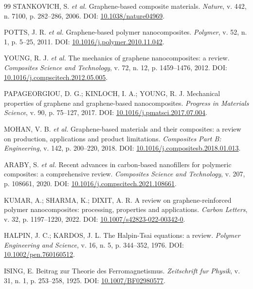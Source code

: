 \documentclass[11pt,a4paper,oneside]{article}
\begin{document}
\begin{thebibliography}{99}
 STANKOVICH, S. \textit{et al.} Graphene-based composite materials. \textit{Nature}, v. 442, n. 7100, p. 282--286, 2006. DOI: \href{https://doi.org/10.1038/nature04969}{10.1038/nature04969}.

 POTTS, J. R. \textit{et al.} Graphene-based polymer nanocomposites. \textit{Polymer}, v. 52, n. 1, p. 5--25, 2011. DOI: \href{https://doi.org/10.1016/j.polymer.2010.11.042}{10.1016/j.polymer.2010.11.042}.

 YOUNG, R. J. \textit{et al.} The mechanics of graphene nanocomposites: a review. \textit{Composites Science and Technology}, v. 72, n. 12, p. 1459--1476, 2012. DOI: \href{https://doi.org/10.1016/j.compscitech.2012.05.005}{10.1016/j.compscitech.2012.05.005}.

 PAPAGEORGIOU, D. G.; KINLOCH, I. A.; YOUNG, R. J. Mechanical properties of graphene and graphene-based nanocomposites. \textit{Progress in Materials Science}, v. 90, p. 75--127, 2017. DOI: \href{https://doi.org/10.1016/j.pmatsci.2017.07.004}{10.1016/j.pmatsci.2017.07.004}.

 MOHAN, V. B. \textit{et al.} Graphene-based materials and their composites: a review on production, applications and product limitations. \textit{Composites Part B: Engineering}, v. 142, p. 200--220, 2018. DOI: \href{https://doi.org/10.1016/j.compositesb.2018.01.013}{10.1016/j.compositesb.2018.01.013}.

 ARABY, S. \textit{et al.} Recent advances in carbon-based nanofillers for polymeric composites: a comprehensive review. \textit{Composites Science and Technology}, v. 207, p. 108661, 2020. DOI: \href{https://doi.org/10.1016/j.compscitech.2021.108661}{10.1016/j.compscitech.2021.108661}.

 KUMAR, A.; SHARMA, K.; DIXIT, A. R. A review on graphene-reinforced polymer nanocomposites: processing, properties and applications. \textit{Carbon Letters}, v. 32, p. 1197--1220, 2022. DOI: \href{https://doi.org/10.1007/s42823-022-00342-0}{10.1007/s42823-022-00342-0}.

 HALPIN, J. C.; KARDOS, J. L. The Halpin-Tsai equations: a review. \textit{Polymer Engineering and Science}, v. 16, n. 5, p. 344--352, 1976. DOI: \href{https://doi.org/10.1002/pen.760160512}{10.1002/pen.760160512}.

 ISING, E. Beitrag zur Theorie des Ferromagnetismus. \textit{Zeitschrift fur Physik}, v. 31, n. 1, p. 253--258, 1925. DOI: \href{https://doi.org/10.1007/BF02980577}{10.1007/BF02980577}.


\end{thebibliography}
\end{document}

